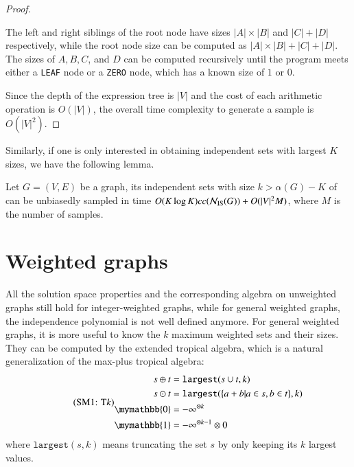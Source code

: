 \documentclass[review, onefignum, onetabnum]{siamart190516}
\begin{document}
\begin{proof}
\begin{example}
The left and right siblings of the root node have sizes $|A|\times |B|$ and $|C|+|D|$ respectively, while the root node size can be computed as $|A|\times |B| + |C|+|D|$.
The sizes of $A, B, C$, and $D$ can be computed recursively until the program meets either a \texttt{LEAF} node or a \texttt{ZERO} node, which has a known size of $1$ or $0$.
\end{example}

Since the depth of the expression tree is $|V|$ and the cost of each arithmetic operation is $O(|V|)$, the overall time complexity to generate a sample is $O(|V|^2)$.
\end{proof}

Similarly, if one is only interested in obtaining independent sets with largest $K$ sizes, we have the following lemma.
\begin{lemma}
    Let $G = (V, E)$ be a graph, its independent sets with size $k > \alpha(G)-K$ of can be unbiasedly sampled in time $O(K\log K)cc({\mathcal{N}_{\rm IS}(G)}) + O(|V|^2 M)$, where $M$ is the number of samples.
\end{lemma}

\section{Weighted graphs}\label{sec:weighted}

All the solution space properties and the corresponding algebra on unweighted graphs still hold for integer-weighted graphs, while for general weighted graphs, the independence polynomial is not well defined anymore.
For general weighted graphs, it is more useful to know the $k$ maximum weighted sets and their sizes.
They can be computed by the extended tropical algebra, which is a natural generalization of the max-plus tropical algebra:
\begin{equation}
\eqname{T$k$}
\begin{split}
    s \oplus t &= \texttt{largest}(s \cup t, k)\\
    s \odot t &= \texttt{largest}(\{a+b | a \in s, b\in t\}, k)\\
    \mymathbb{0} &= -\infty^{\otimes k}\\
    \mymathbb{1} &= -\infty^{\otimes k-1} \otimes 0
\end{split}\label{eq:ext-tropical}
\end{equation}
where $\texttt{largest}(s, k)$ means truncating the set $s$ by only keeping its $k$ largest values.
\end{document}
